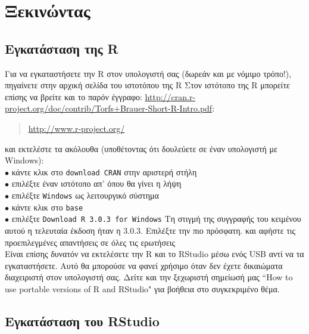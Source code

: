 \documentclass[a4paper,10pt,twocolumn]{article}
\makeatletter
\let\SF@@footnote\footnote
\def\footnote{\ifx\protect\@typeset@protect
 \expandafter\SF@@footnote
 \else
 \expandafter\SF@gobble@opt
 \fi
}
\edef\SF@gobble@opt{\noexpand\protect
 \expandafter\noexpand\csname SF@gobble@opt \endcsname}
\makeatother
\begin{document}
\section{Ξεκινώντας}

\subsection{Εγκατάσταση της R}

Για να εγκαταστήσετε την R στον υπολογιστή σας (δωρεάν και με νόμιμο τρόπο!), πηγαίνετε στην
αρχική σελίδα του ιστοτόπου της R\footnote{Στον ιστότοπο της R μπορείτε επίσης να βρείτε και το παρόν έγγραφο: \url{http://cran.r-project.org/doc/contrib/Torfs+Brauer-Short-R-Intro.pdf}}:
\begin{quote}
  \url{http://www.r-project.org/}
\end{quote}
και εκτελέστε τα ακόλουθα (υποθέτοντας ότι δουλεύετε σε έναν υπολογιστή με Windows):\\
\noindent $\bullet$ κάντε κλικ στο \texttt{download CRAN} στην αριστερή στήλη\\
\noindent $\bullet$ επιλέξτε έναν ιστότοπο  απ' όπου θα γίνει η λήψη\\
\noindent $\bullet$ επιλέξτε \texttt{Windows} ως λειτουργικό σύστημα\\
\noindent $\bullet$ κάντε κλικ στο \texttt{base}\\
\noindent $\bullet$ επιλέξτε \texttt{Download R 3.0.3 for Windows} \footnote{Τη στιγμή της
συγγραφής του κειμένου αυτού η τελευταία έκδοση ήταν η 3.0.3. Επιλέξτε την πιο πρόσφατη.} και
αφήστε τις προεπιλεγμένες απαντήσεις σε όλες τις ερωτήσεις\\

Είναι επίσης δυνατόν να εκτελέσετε την R και το RStudio μέσω ενός USB αντί να τα εγκαταστήσετε. Αυτό
θα μπορούσε να φανεί χρήσιμο όταν δεν έχετε δικαιώματα διαχειριστή στον υπολογιστή σας. Δείτε και 
την ξεχωριστή σημείωσή μας ``How to use portable versions of R and RStudio" για βοήθεια στο 
συγκεκριμένο θέμα.

\subsection{Εγκατάσταση του RStudio}
\end{document}
